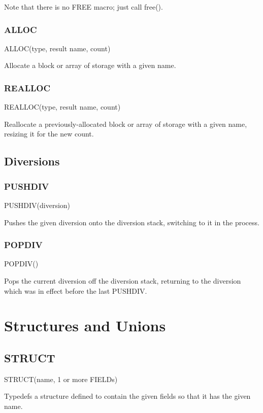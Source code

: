 \documentclass[english]{article}
\begin{document}
Note that there is no FREE macro; just call free().


\subsubsection{ALLOC}

ALLOC(type, result name, count)

Allocate a block or array of storage with a given name.


\subsubsection{REALLOC}

REALLOC(type, result name, count)

Reallocate a previously-allocated block or array of storage with a
given name, resizing it for the new count.


\subsection{Diversions}


\subsubsection{PUSHDIV}

PUSHDIV(diversion)

Pushes the given diversion onto the diversion stack, switching to
it in the process.


\subsubsection{POPDIV}

POPDIV()

Pops the current diversion off the diversion stack, returning to the
diversion which was in effect before the last PUSHDIV.


\section{Structures and Unions}


\subsection{STRUCT}

STRUCT(name, 1 or more FIELDs)

Typedefs a structure defined to contain the given fields so that it
has the given name.
\end{document}
